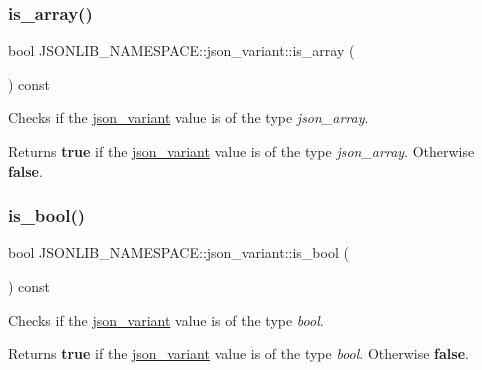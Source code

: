 \subsubsection{\texorpdfstring{is\+\_\+array()}{is\_array()}\hspace{0.1cm}{\footnotesize\ttfamily [2/2]}}
{\footnotesize\ttfamily bool J\+S\+O\+N\+L\+I\+B\+\_\+\+N\+A\+M\+E\+S\+P\+A\+C\+E\+::json\+\_\+variant\+::is\+\_\+array (\begin{DoxyParamCaption}{ }\end{DoxyParamCaption}) const}



Checks if the \hyperlink{classJSONLIB__NAMESPACE_1_1json__variant}{json\+\_\+variant} value is of the type {\itshape json\+\_\+array}. 

\begin{DoxyReturn}{Returns}
{\bfseries true} if the \hyperlink{classJSONLIB__NAMESPACE_1_1json__variant}{json\+\_\+variant} value is of the type {\itshape json\+\_\+array}. Otherwise {\bfseries false}. 
\end{DoxyReturn}
\mbox{\label{classJSONLIB__NAMESPACE_1_1json__variant_a99bd3f5d21800b7b1cc7af956c17d534}} 
\subsubsection{\texorpdfstring{is\+\_\+bool()}{is\_bool()}\hspace{0.1cm}{\footnotesize\ttfamily [1/2]}}
{\footnotesize\ttfamily bool J\+S\+O\+N\+L\+I\+B\+\_\+\+N\+A\+M\+E\+S\+P\+A\+C\+E\+::json\+\_\+variant\+::is\+\_\+bool (\begin{DoxyParamCaption}{ }\end{DoxyParamCaption}) const}



Checks if the \hyperlink{classJSONLIB__NAMESPACE_1_1json__variant}{json\+\_\+variant} value is of the type {\itshape bool}. 

\begin{DoxyReturn}{Returns}
{\bfseries true} if the \hyperlink{classJSONLIB__NAMESPACE_1_1json__variant}{json\+\_\+variant} value is of the type {\itshape bool}. Otherwise {\bfseries false}. 
\end{DoxyReturn}
\mbox{\label{classJSONLIB__NAMESPACE_1_1json__variant_a99bd3f5d21800b7b1cc7af956c17d534}} 
